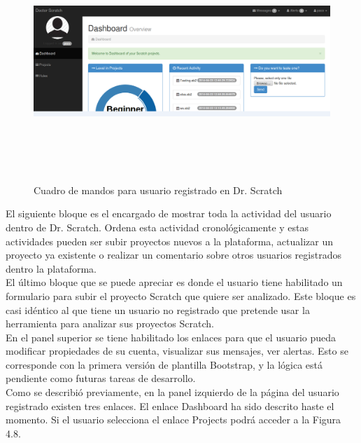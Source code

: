 \documentclass[a4paper, 12pt]{book}
\begin{document}
\begin{figure}[h]
  \centering
	\graphicspath{{img/}}
  \includegraphics[bb=0 0 800 600, width=18cm, height=9cm, keepaspectratio]{dashboardprincipal.png}
	\caption{Cuadro de mandos para usuario registrado en Dr. Scratch}
  \label{figura:foro_hilos}
\end{figure}


El siguiente bloque es el encargado de mostrar toda la actividad del usuario dentro de Dr. Scratch.
Ordena esta actividad cronológicamente y estas actividades pueden ser subir proyectos 
nuevos a la plataforma, actualizar un proyecto ya existente o realizar un comentario sobre
otros usuarios registrados dentro la plataforma. \\

El último bloque que se puede apreciar es donde el usuario tiene habilitado un formulario 
para subir el proyecto Scratch que quiere ser analizado. Este bloque es casi idéntico al 
que tiene un usuario no registrado que  pretende usar la herramienta para analizar sus
 proyectos Scratch. \\ 

En el panel superior se tiene habilitado los enlaces para que el usuario pueda modificar
propiedades de su cuenta, visualizar sus mensajes, ver alertas. Esto se corresponde con
la primera versión de plantilla Bootstrap, y la lógica está pendiente como futuras tareas
de desarrollo. \\ 



Como se describió previamente, en la panel izquierdo de la página del usuario registrado 
existen tres enlaces. El enlace Dashboard ha sido descrito haste el momento. Si el usuario
selecciona el enlace Projects podrá acceder a la Figura 4.8.  
\end{document}
